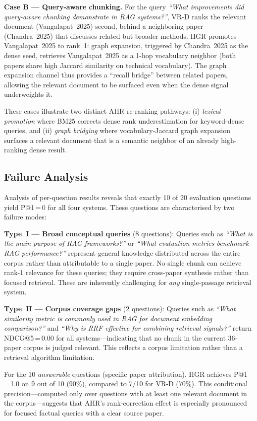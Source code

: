 \documentclass[journal]{IEEEtran}
\begin{document}
\textbf{Case B — Query-aware chunking.}
For the query \textit{``What improvements did query-aware chunking
demonstrate in RAG systems?''}, VR-D ranks the relevant document
(Vangalapat~2025) second, behind a neighboring paper (Chandra~2025)
that discusses related but broader methods. HGR promotes
Vangalapat~2025 to rank~1: graph expansion, triggered by Chandra~2025
as the dense seed, retrieves Vangalapat~2025 as a 1-hop vocabulary
neighbor (both papers share high Jaccard similarity on technical
vocabulary). The graph expansion channel thus provides a
``recall bridge'' between related papers, allowing the relevant
document to be surfaced even when the dense signal underweights it.

These cases illustrate two distinct AHR re-ranking pathways:
(i) \textit{lexical promotion} where BM25 corrects dense rank
underestimation for keyword-dense queries, and
(ii) \textit{graph bridging} where vocabulary-Jaccard graph expansion
surfaces a relevant document that is a semantic neighbor of an already
high-ranking dense result.

\subsection{Failure Analysis}

Analysis of per-question results reveals that exactly 10 of 20
evaluation questions yield P@1\,=\,0 for all four systems. These
questions are characterised by two failure modes:

\textbf{Type~I — Broad conceptual queries} (8 questions):
Queries such as \textit{``What is the main purpose of RAG frameworks?''}
or \textit{``What evaluation metrics benchmark RAG performance?''}
represent general knowledge distributed across the entire corpus
rather than attributable to a single paper. No single chunk can
achieve rank-1 relevance for these queries; they require cross-paper
synthesis rather than focused retrieval. These are inherently
challenging for \textit{any} single-passage retrieval system.

\textbf{Type~II — Corpus coverage gaps} (2 questions):
Queries such as \textit{``What similarity metric is commonly used
in RAG for document embedding comparison?''} and
\textit{``Why is RRF effective for combining retrieval signals?''}
return NDCG@5\,=\,0.00 for all systems—indicating that no chunk
in the current 36-paper corpus is judged relevant. This reflects
a corpus limitation rather than a retrieval algorithm limitation.

For the 10 \textit{answerable} questions (specific paper attribution),
HGR achieves P@1\,=\,1.0 on 9 out of 10 (90\%), compared to 7/10
for VR-D (70\%). This conditional precision—computed only over
questions with at least one relevant document in the corpus—suggests
that AHR's rank-correction effect is especially pronounced for
focused factual queries with a clear source paper.
\end{document}
